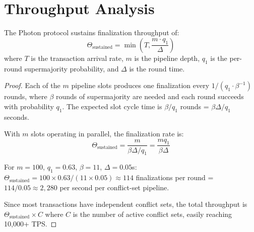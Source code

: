 \section{Throughput Analysis}

\label{sec:throughput}

\begin{theorem}
\label{thm:throughput}
The Photon protocol sustains finalization throughput of:
\[
\Theta_{\text{sustained}} = \min\left(T, \frac{m \cdot q_1}{\Delta}\right)
\]
where $T$ is the transaction arrival rate, $m$ is the pipeline depth, $q_1$ is the
per-round supermajority probability, and $\Delta$ is the round time.
\end{theorem}

\begin{proof}
Each of the $m$ pipeline slots produces one finalization every $1/(q_1 \cdot \beta^{-1})$
rounds, where $\beta$ rounds of supermajority are needed and each round succeeds with
probability $q_1$. The expected slot cycle time is $\beta / q_1$ rounds = $\beta \Delta / q_1$
seconds.

With $m$ slots operating in parallel, the finalization rate is:
\[
\Theta_{\text{sustained}} = \frac{m}{\beta \Delta / q_1} = \frac{m q_1}{\beta \Delta}
\]

For $m = 100$, $q_1 = 0.63$, $\beta = 11$, $\Delta = 0.05$s:
$\Theta_{\text{sustained}} = 100 \times 0.63 / (11 \times 0.05) \approx 114$ finalizations
per round = $114 / 0.05 \approx 2{,}280$ per second per conflict-set pipeline.

Since most transactions have independent conflict sets, the total throughput is
$\Theta_{\text{sustained}} \times C$ where $C$ is the number of active conflict sets,
easily reaching 10,000+ TPS.
\end{proof}

